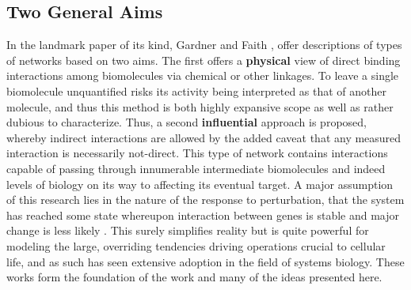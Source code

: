\subsection{Two General Aims}
\label{sec:purpose}
In the landmark paper of its kind, Gardner and Faith \cite{gardner2005reverse},\cite{HECKER200986} offer descriptions of types of networks based on two aims. The first offers a \textbf{physical} view of direct binding interactions among biomolecules via chemical or other linkages. To leave a single biomolecule unquantified risks its activity being interpreted as that of another molecule, and thus this method is both highly expansive scope as well as rather dubious to characterize. Thus, a second \textbf{influential} approach is proposed, whereby indirect interactions are allowed by the added caveat that any measured interaction is necessarily not-direct. This type of network contains interactions capable of passing through innumerable intermediate biomolecules and indeed levels of biology on its way to affecting its eventual target. A major assumption of this research lies in the nature of the response to perturbation, \ie that the system has reached some state whereupon interaction between genes is stable and major change is less likely \cite{gardner2003inferring, faith2007large}. This surely simplifies reality but is quite powerful for modeling the large, overriding tendencies driving operations crucial to cellular life, and as such has seen extensive adoption in the field of systems biology.  These works form the foundation of the work and many of the ideas presented here. 



